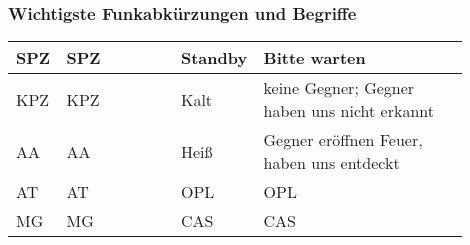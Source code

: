 \subsubsection{Wichtigste Funkabkürzungen und Begriffe}
	\begin{tabular}{|p{0.1\linewidth}|p{0.25\linewidth}||p{0.1\linewidth}|p{0.45\linewidth}|} \hline
		\acs{SPZ}	& \acl{SPZ}	& Standby	& Bitte warten \hfil\\ \hline 
		\acs{KPZ}	& \acl{KPZ}	& Kalt		& keine Gegner; Gegner haben uns nicht erkannt\\ \hline
		\acs{AA}	& \acl{AA}	& Heiß 		& Gegner eröffnen Feuer, haben uns entdeckt \\ \hline
		\acs{AT}	& \acl{AT}	& \acs{OPL}	& \acl{OPL} \\ \hline
		\acs{MG}	& \acl{MG}	& \acs{CAS}	& \acl{CAS} \\ \hline
	\end{tabular}


